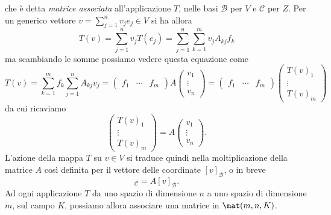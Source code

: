 che è detta \emph{matrice associata} all'applicazione $T$, nelle basi $\mathcal B$ per $V$ e $\mathcal C$ per $Z$.
Per un generico vettore $v=\sum_{j=1}^nv_je_j\in V$ si ha allora
\begin{equation}
	T(v)=\sum_{j=1}^nv_jT(e_j)=\sum_{j=1}^n\sum_{k=1}^mv_jA_{kj}f_k
\end{equation}
ma scambiando le somme possiamo vedere questa equazione come
\begin{equation}
	T(v)=\sum_{k=1}^mf_k\sum_{j=1}^nA_{kj}v_j=
	\begin{pmatrix}
		f_1&\cdots&f_m
	\end{pmatrix}
	A
	\begin{pmatrix}
		v_1\\
		\vdots\\
		v_n
	\end{pmatrix}
	=
	\begin{pmatrix}
		f_1&\cdots&f_m
	\end{pmatrix}
	\begin{pmatrix}
		T(v)_1\\
		\vdots\\
		T(v)_m
	\end{pmatrix}
\end{equation}
da cui ricaviamo
\begin{equation}
	\begin{pmatrix}
		T(v)_1\\
		\vdots\\
		T(v)_m
	\end{pmatrix}
	=A
	\begin{pmatrix}
		v_1\\
		\vdots\\
		v_n
	\end{pmatrix}.
\end{equation}
L'azione della mappa $T$ su $v\in V$ si traduce quindi nella moltiplicazione della matrice $A$ cos\`i definita per il vettore delle coordinate $[v]_{\mathcal B}$, o in breve
\begin{equation}
	[T(v)]_{\mathcal C}=A[v]_{\mathcal B}.
\end{equation}
Ad ogni applicazione $T$ da uno spazio di dimensione $n$ a uno spazio di dimensione $m$, sul campo $K$, possiamo allora associare una matrice in $\mat(m,n,K)$.

